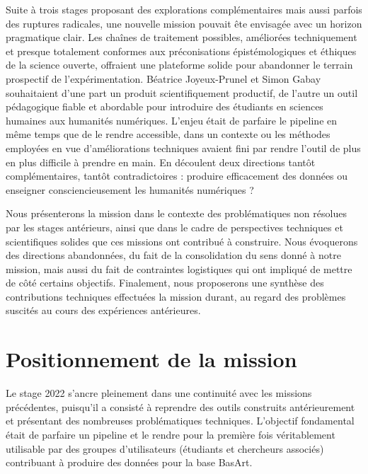 \documentclass[a4paper,12pt,twoside]{book}
\begin{document}
Suite à trois stages proposant des explorations complémentaires mais aussi parfois des ruptures radicales, une nouvelle mission pouvait ête envisagée avec un horizon pragmatique clair. Les chaînes de traitement possibles, améliorées techniquement et presque totalement conformes aux préconisations épistémologiques et éthiques de la science ouverte, offraient une plateforme solide pour abandonner le terrain prospectif de l'expérimentation. Béatrice Joyeux-Prunel et Simon Gabay souhaitaient d'une part un produit scientifiquement productif, de l'autre un outil pédagogique fiable et abordable pour introduire des étudiants en sciences humaines aux humanités numériques. L'enjeu était de parfaire le pipeline en même temps que de le rendre accessible, dans un contexte ou les méthodes employées en vue d'améliorations techniques avaient fini par rendre l'outil de plus en plus difficile à prendre en main. En découlent deux directions tantôt complémentaires, tantôt contradictoires : produire efficacement des données ou enseigner consciencieusement les humanités numériques ? 

Nous présenterons la mission dans le contexte des problématiques non résolues par les stages antérieurs, ainsi que dans le cadre de perspectives techniques et scientifiques solides que ces missions ont contribué à construire. Nous évoquerons des directions abandonnées, du fait de la consolidation du sens donné à notre mission, mais aussi du fait de contraintes logistiques qui ont impliqué de mettre de côté certains objectifs. Finalement, nous proposerons une synthèse des contributions techniques effectuées la mission durant, au regard des problèmes suscités au cours des expériences antérieures.


\section{Positionnement de la mission}

Le stage 2022 s'ancre pleinement dans une continuité avec les missions précédentes, puisqu'il a consisté à reprendre des outils construits antérieurement et présentant des nombreuses problématiques techniques. L'objectif fondamental était de parfaire un pipeline et le rendre pour la première fois véritablement utilisable par des groupes d'utilisateurs (étudiants et chercheurs associés) contribuant à produire des données pour la base BasArt. 
\end{document}
